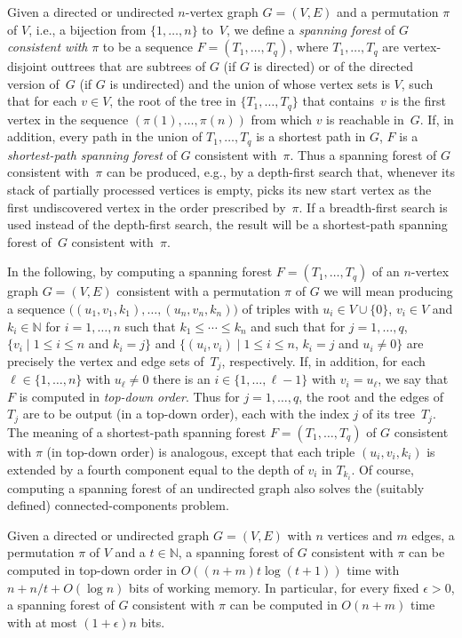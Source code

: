 \documentclass[envcountsame,envcountsect,undated,nolinenumbers]{lnthi}
\def\TbbbN{\mathbb{N}}
\begin{document}
Given a directed or undirected
$n$-vertex graph $G=(V,E)$
and a permutation 
$\pi$ of $V$, i.e., a
bijection from $\{1,\ldots,n\}$ to~$V$,
we define a \emph{spanning forest} of $G$
\emph{consistent with} $\pi$ to be a sequence
$F=(T_1,\ldots,T_q)$, where $T_1,\ldots,T_q$
are vertex-disjoint outtrees that are
subtrees of $G$
(if $G$ is directed) or of the directed version of~$G$
(if $G$ is undirected) and the union of whose vertex sets
is $V$, such that for each $v\in V$, the root of
the tree in $\{T_1,\ldots,T_q\}$ that contains~$v$
is the first vertex in the sequence
$(\pi(1),\ldots,\pi(n))$ from which $v$ is reachable in~$G$.
If, in addition, every path in the union
of $T_1,\ldots,T_q$
is a shortest path in $G$, $F$ is a
\emph{shortest-path spanning forest} of $G$
consistent with~$\pi$.
Thus a spanning forest of $G$ consistent with~$\pi$
can be produced, e.g., by a depth-first search that,
whenever its stack of partially processed vertices
is empty, picks its new start vertex
as the first undiscovered vertex in the order
prescribed by~$\pi$.
If a breadth-first search is used instead of the
depth-first search, the result will be a
shortest-path spanning forest of~$G$
consistent with~$\pi$.

In the following, by computing a spanning forest
$F=(T_1,\ldots,T_q)$
of an $n$-vertex graph $G=(V,E)$ consistent with
a permutation $\pi$ of $G$ we will mean producing a
sequence $((u_1,v_1,k_1),\ldots,$\break$(u_n,v_n,k_n))$ of
triples with $u_i\in V\cup\{0\}$, $v_i\in V$
and $k_i\in\TbbbN$ for $i=1,\ldots,n$ such that
$k_1\le\cdots\le k_n$
and such that for $j=1,\ldots,q$,
$\{v_i\mid 1\le i\le n$ and $k_i=j\}$ and
$\{(u_i,v_i)\mid 1\le i\le n$,
$k_i=j$ and $u_i\not=0\}$ 
are precisely the vertex and edge sets of~$T_j$,
respectively.
If, in addition, for each $\ell\in\{1,\ldots,n\}$
with $u_\ell\not=0$ there is an $i\in\{1,\ldots,\ell-1\}$
with $v_i=u_\ell$, we say that $F$ is computed in
\emph{top-down order}.
Thus for $j=1,\ldots,q$, the root and
the edges of $T_j$ are to
be output (in a top-down order),
each with the index $j$ of its tree~$T_j$.
The meaning of a shortest-path spanning forest
$F=(T_1,\ldots,T_q)$
of $G$ consistent with $\pi$ (in top-down order)
is analogous,
except that each triple $(u_i,v_i,k_i)$
is extended by a
fourth component equal to the depth of $v_i$
in $T_{k_i}$.
Of course, computing a spanning forest of an
undirected graph also solves the
(suitably defined) connected-components
problem.

\begin{theorem}
\label{thm:cc}Given a directed or undirected graph $G=(V,E)$
with $n$ vertices and $m$ edges,
a permutation $\pi$ of $V$ and a $t\in\TbbbN$,
a spanning forest of $G$ consistent with $\pi$
can be computed in
top-down order in
$O((n+m)t\log(t+1))$ time with
$n+{n/t}+O(\log n)$ bits of working memory.
In particular, for every fixed $\epsilon>0$,
a spanning forest of $G$ consistent with $\pi$
can be computed in $O(n+m)$ time
with at most $(1+\epsilon)n$ bits.
\end{theorem}
\end{document}
